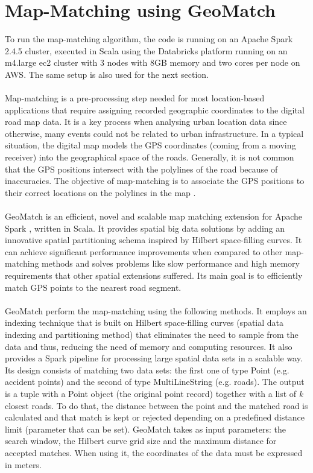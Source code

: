 \section{Map-Matching using GeoMatch} \label{sec:map_matching}
To run the map-matching algorithm, the code is running on an Apache Spark 2.4.5 cluster, executed in Scala using the Databricks platform running on an m4.large ec2 cluster with 3 nodes with 8GB memory and two cores per node on \ac{AWS}. The same setup is also used for the next section.\\
\\
Map-matching is a pre-processing step needed for most location-based applications that require assigning recorded geographic coordinates to the digital road map data. It is a key process when analysing urban location data since otherwise, many events could not be related to urban infrastructure. 
In a typical situation, the digital map models the \ac{GPS} coordinates (coming from a moving receiver) into the geographical space of the roads. Generally, it is not common that the GPS positions intersect with the polylines of the road because of inaccuracies. The objective of map-matching is to associate the \ac{GPS} positions to their correct locations on the polylines in the map \cite{map-matching}.
\\
\\
GeoMatch \cite{geomatch_code} is an efficient, novel and scalable map matching extension for Apache Spark \cite{geomatch}, written in Scala. It provides spatial big data solutions by adding an innovative spatial partitioning schema inspired by Hilbert space-filling curves. It can achieve significant performance improvements when compared to other map-matching methods and solves problems like slow performance and high memory requirements that other spatial extensions suffered. Its main goal is to efficiently match \ac{GPS} points to the nearest road segment. 
\\
\\
GeoMatch perform the map-matching using the following methods. It employs an indexing technique that is built on Hilbert space-filling curves (spatial data indexing and partitioning method) that eliminates the need to sample from the data and thus, reducing the need of memory and computing resources. It also provides a Spark pipeline for processing large spatial data sets in a scalable way. Its design consists of matching two data sets: the first one of type Point (e.g. accident points) and the second of type MultiLineString (e.g. roads). The output is a tuple with a Point object (the original point record) together with a list of \textit{k} closest roads. To do that, the distance between the point and the matched road is calculated and that match is kept or rejected depending on a predefined distance limit (parameter that can be set). GeoMatch takes as input parameters: the search window, the Hilbert curve grid size and the maximum distance for accepted matches. When using it, the coordinates of the data must be expressed in meters. 
